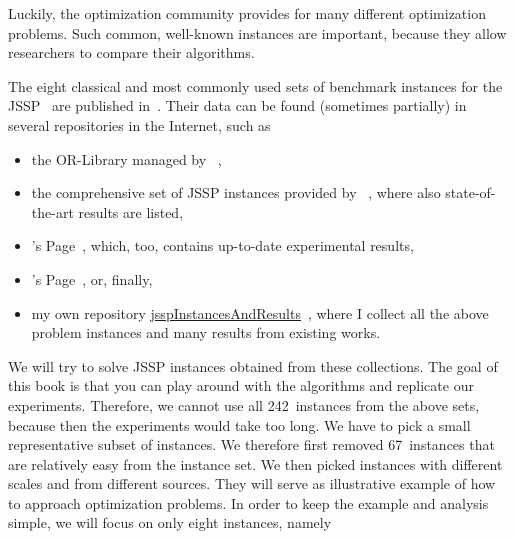 Luckily, the optimization community provides  for many different optimization problems.
Such common, well-known instances are important, because they allow researchers to compare their algorithms.

The eight classical and most commonly used sets of benchmark instances for the \gls{JSSP}~\cite{H2002PJSSP} are published in~\cite{FT1963PLCOLJSSR,ABZ1988TSBPFJSS,AC1991ACSOTJSSP,SWV1992NSSFSPWATJSS,YN1992AGAATLSJSI,L1998RCPSAEIOHSTS,DMU1998BFSSP,T1993BFBSP}.
Their data can be found (sometimes partially) in several repositories in the Internet, such as%
%
\begin{itemize}%
%
\item the OR\nobreakdash-Library managed by ~\cite{B1990OLDTPBEM},%
%
\item the comprehensive set of \gls{JSSP} instances provided by ~\cite{vH2015JSIAS,vH2018TCSOBOBIOTJSSP}, where also state-of-the-art results are listed,%
%
\item {}'s Page~\cite{S2019JSSPH}, which, too, contains up-to-date experimental results,%
%
\item {}'s Page~\cite{T1993SI}, or, finally,%
%
\item my own repository \href{http://github.com/thomasWeise/jsspInstancesAndResults}{jsspInstancesAndResults}~\cite{W2019JRDAIOTJSSP}, where I collect all the above problem instances and many results from existing works.%
%
\end{itemize}%
%
We will try to solve \gls{JSSP} instances obtained from these collections.
The goal of this book is that you can play around with the algorithms and replicate our experiments.
Therefore, we cannot use all 242~instances from the above sets, because then the experiments would take too long.
We have to pick a small representative subset of instances.
We therefore first removed 67~instances that are relatively easy from the instance set.
We then picked instances with different scales and from different sources.
They will serve as illustrative example of how to approach optimization problems.
In order to keep the example and analysis simple, we will focus on only eight instances, namely%
%
